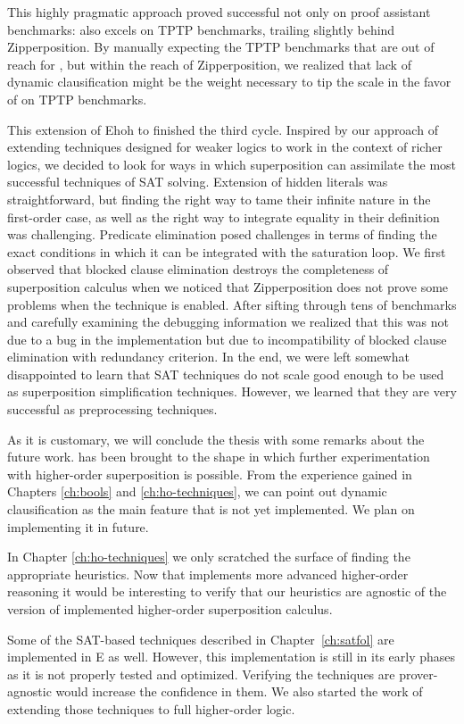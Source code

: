 This highly pragmatic approach proved successful not only on proof assistant
benchmarks: \ehohii{} also excels on TPTP benchmarks, trailing slightly behind
Zipperposition. By manually expecting the TPTP benchmarks that are out of reach
for \ehohii{}, but within the reach of Zipperposition, we realized that lack of
dynamic clausification might be the weight necessary to tip the scale in the
favor of \ehohii{} on TPTP benchmarks.

This extension of Ehoh to \ehohii{} finished the third cycle. Inspired by our
approach of extending techniques designed for weaker logics to work in the
context of richer logics, we decided to look for ways in which superposition can
assimilate the most successful techniques of SAT solving. Extension of hidden
literals was straightforward, but finding the right way to tame their infinite
nature in the first-order case, as well as the right way to integrate equality
in their definition was challenging. Predicate elimination posed challenges in
terms of finding the exact conditions in which it can be integrated with the
saturation loop. We first observed that blocked clause elimination destroys the
completeness of superposition calculus when we noticed that Zipperposition does
not prove some problems when the technique is enabled. After sifting through tens of
benchmarks and carefully examining the debugging information we realized that
this was not due to a bug in the implementation but due to incompatibility of
blocked clause elimination with redundancy criterion. In the end, we were left
somewhat disappointed to learn that SAT techniques do not scale good enough to be used
as superposition simplification techniques. However, we learned that they are
very successful as preprocessing techniques.

As it is customary, we will conclude the thesis with some remarks about the future work. \ehohii{} has been brought to the shape
in which further experimentation with higher-order superposition is possible.
From the experience gained in Chapters \ref{ch:bools} and
\ref{ch:ho-techniques}, we can point out dynamic clausification as the main
feature that is not yet implemented. We plan on implementing it in future.

In Chapter \ref{ch:ho-techniques} we only scratched the surface of finding the
appropriate heuristics. Now that \ehohii{} implements more advanced higher-order
reasoning it would be interesting to verify that our heuristics are agnostic of
the version of implemented higher-order superposition calculus. 

Some of the SAT-based techniques described in Chapter~\ref{ch:satfol} are
implemented in E as well. However, this implementation is still in its early
phases as it is not properly tested and optimized. Verifying the techniques are
prover-agnostic would increase the confidence in them. We also started the work of extending
those techniques to full higher-order logic.
